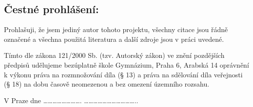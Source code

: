 \thispagestyle{empty}
\mbox{}
\vfill
\begin{Large}
\section*{\textbf{Čestné prohlášení:}}
\end{Large}

\par Prohlašuji, že jsem jediný autor tohoto projektu, všechny citace jsou řádně označené a všechna použitá literatura a další zdroje jsou v práci uvedené. \par Tímto dle zákona 121/2000 Sb. (tzv. Autorský zákon) ve znění pozdějších předpisů udělujeme bezúplatně škole Gymnázium, Praha 6, Arabská 14 oprávnění k výkonu práva na rozmnožování díla (§ 13) a práva na sdělování díla veřejnosti (§ 18) na dobu časově neomezenou a bez omezení územního rozsahu. 
\newline


V Praze dne ……………………. \hspace{30pt}  ……………………………..




